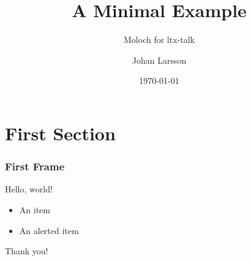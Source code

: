 \documentclass{ltx-talk}
\title{A Minimal Example}
\subtitle{Moloch for ltx-talk}
\author{Johan Larsson}
\institute{Some University}
\date{\today}
\begin{document}
\maketitle

\section{First Section}

\begin{frame}
  \frametitle{First Frame}

  Hello, world!

  \begin{itemize}
    \item An item
    \item \alert{An alerted item}
  \end{itemize}
\end{frame}

\begin{standout}
  Thank you!
\end{standout}
\end{document}
